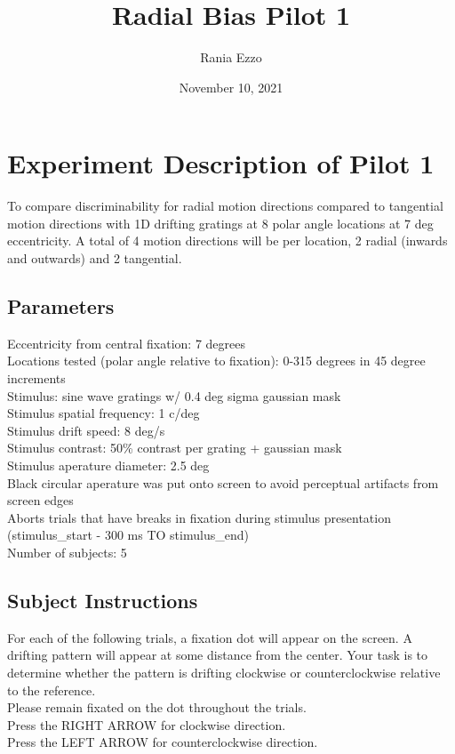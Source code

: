 \documentclass[11pt]{article} %
\title{Radial Bias Pilot 1}
\date{November 10, 2021}
\author{Rania Ezzo}
\begin{document}
\maketitle
\tableofcontents


\section{Experiment Description of Pilot 1}
To compare discriminability for radial motion directions compared to tangential motion directions with 1D drifting gratings at 8 polar angle locations at 7 deg eccentricity. A total of 4 motion directions will be per location, 2 radial (inwards and outwards) and 2 tangential.

\subsection{Parameters}
Eccentricity from central fixation: 7 degrees
\\
Locations tested (polar angle relative to fixation): 0-315 degrees in 45 degree increments
\\
Stimulus: sine wave gratings w/ 0.4 deg sigma gaussian mask
\\
Stimulus spatial frequency: 1 c/deg
\\
Stimulus drift speed: 8 deg/s
\\
Stimulus contrast: 50\% contrast per grating + gaussian mask
\\
Stimulus aperature diameter: 2.5 deg
\\
Black circular aperature was put onto screen to avoid perceptual artifacts from screen edges
\\
Aborts trials that have breaks in fixation during stimulus presentation (stimulus\_start - 300 ms TO stimulus\_end)
\\
Number of subjects: 5

\subsection{Subject Instructions}
For each of the following trials, a fixation dot will appear on the screen. A drifting pattern will appear at some distance from the center. Your task is to determine whether the pattern is drifting clockwise or counterclockwise relative to the reference.
\\
Please remain fixated on the dot throughout the trials.
\\
Press the RIGHT ARROW for clockwise direction.
\\
Press the LEFT ARROW for counterclockwise direction.
\end{document}

